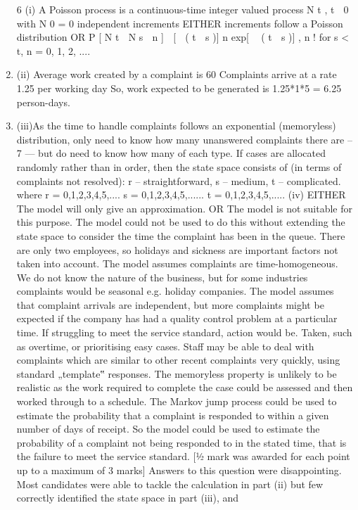 \documentclass[a4paper,12pt]{article}
\begin{document}
\begin{enumerate}
6
(i) A Poisson process is a continuous-time integer valued process
N t , t  0 with
N 0 = 0
independent increments
EITHER
increments follow a Poisson distribution
OR
P [ N t  N s  n ] 
[  ( t  s )] n exp[  ( t  s )]
,
n !
for s < t, n = 0, 1, 2, ....
\item (ii) Average work created by a complaint is
60%
Complaints arrive at a rate 1.25 per working day
So, work expected to be generated is 1.25*1*5 = 6.25 person-days.
\item (iii)As the time to handle complaints follows an exponential (memoryless)
distribution, only need to know how many unanswered complaints there are –
7  — %
but do need to know how many of each type. If cases are allocated randomly
rather than in order, then the state space consists of (in terms of complaints not
resolved):
r – straightforward,
s – medium,
t – complicated.
where r = 0,1,2,3,4,5,....
s = 0,1,2,3,4,5,......
t = 0,1,2,3,4,5,.....
(iv)
EITHER The model will only give an approximation.
OR The model is not suitable for this purpose.
The model could not be used to do this without extending the state space to
consider the time the complaint has been in the queue. There are only two employees, so holidays and sickness are important factors not taken into
account.
The model assumes complaints are time-homogeneous. We do not know the
nature of the business, but for some industries complaints would be seasonal
e.g. holiday companies.
The model assumes that complaint arrivals are independent, but more
complaints might be expected if the company has had a quality control
problem at a particular time. If struggling to meet the service standard, action
would be. Taken, such as overtime, or prioritising easy cases. Staff may be
able to deal with complaints which are similar to other recent complaints very quickly, using standard „template‟ responses.
The memoryless property is unlikely to be realistic as the work required to
complete the case could be assessed and then worked through to a schedule.
The Markov jump process could be used to estimate the probability that a complaint is responded to within a given number of days of receipt.
So the model could be used to estimate the probability of a complaint not
being responded to in the stated time, that is the failure to meet the service
standard.
[1⁄2 mark was awarded for each point up to a maximum of 3 marks]
Answers to this question were disappointing. Most candidates were able to tackle the
calculation in part (ii) but few correctly identified the state space in part (iii), and

\end{enumerate}
\end{document}
